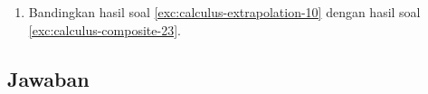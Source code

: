 \begin{enumerate}
\begin{enumerate}
\item \label{exc:calculus-extrapolation-9}${\displaystyle \int_{0}^{2\pi}x\sin(x^{2})dx}$ \hasananswer 
\item ${\displaystyle \int_{0.1}^{2}\frac{1}{x}\,dx}$
\item ${\displaystyle \int_{0}^{2}x^{2}\ln(x^{2}+1)\,dx}$
\end{enumerate}
CATATAN: $\int_{0}^{2}x^{2}\ln(x^{2}+1)\,dx=\frac{24\ln(5)-6\tan^{-1}(2)-4}{9}$.
\item Bandingkan hasil soal \ref{exc:calculus-extrapolation-10} dengan
hasil soal \vref{exc:calculus-composite-23}.
\end{enumerate}
\finishexercises 

\subsection{Jawaban}
